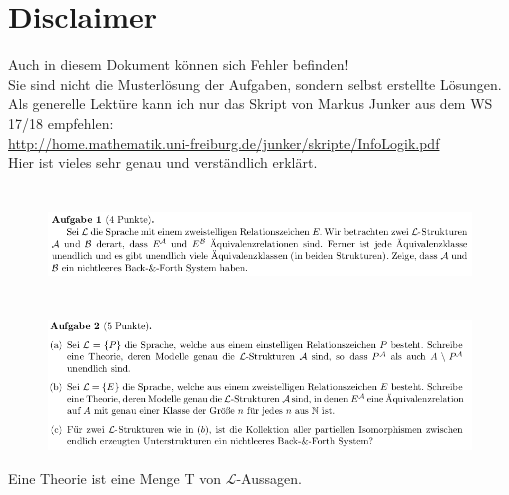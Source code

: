 \documentclass[a4paper]{scrartcl}
\begin{document}
\section*{Disclaimer}%
\label{sec:disclaimer}
Auch in diesem Dokument können sich Fehler befinden!\\
Sie sind nicht die Musterlösung der Aufgaben, sondern selbst erstellte Lösungen.\\

Als generelle Lektüre kann ich nur das Skript von Markus Junker aus dem WS 17/18 empfehlen:\\
\url{http://home.mathematik.uni-freiburg.de/junker/skripte/InfoLogik.pdf}\\
Hier ist vieles sehr genau und verständlich erklärt.

\section*{}%
\label{sec:aufgabe_1}
    \begin{figure}[H]
        \centering
        \includegraphics[scale=0.6]{./A-1.png}
        \label{fig:}
    \end{figure} 



\section*{}%
\label{sec:aufgabe_2}

    \begin{figure}[H]
        \centering
        \includegraphics[scale=0.6]{./A-2.png}
        \label{fig:}
    \end{figure}

    Eine Theorie ist eine Menge T von $\mathscr{L}$-Aussagen.
\end{document}
